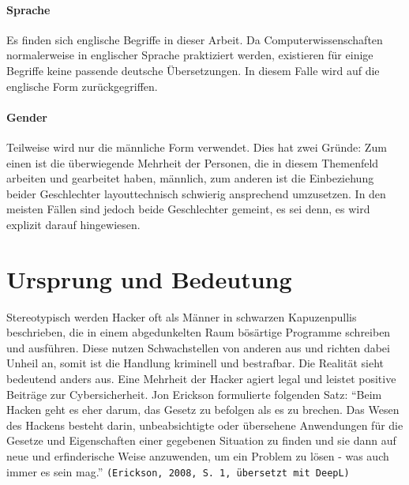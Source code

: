 \documentclass[11pt, a4paper]{article}
\begin{document}
\paragraph{Sprache}
Es finden sich englische Begriffe in dieser Arbeit. Da Computerwissenschaften normalerweise in englischer Sprache praktiziert werden, existieren für einige Begriffe keine passende deutsche Übersetzungen. In diesem Falle wird auf die englische Form zurückgegriffen.
\paragraph{Gender}
Teilweise wird nur die männliche Form verwendet. Dies hat zwei Gründe: Zum einen ist die überwiegende Mehrheit der Personen, die in diesem Themenfeld arbeiten und gearbeitet haben, männlich, zum anderen ist die Einbeziehung beider Geschlechter layouttechnisch schwierig ansprechend umzusetzen. In den meisten Fällen sind jedoch beide Geschlechter gemeint, es sei denn, es wird explizit darauf hingewiesen.

\newpage
\section{Ursprung und Bedeutung}
Stereotypisch werden Hacker oft als Männer in schwarzen Kapuzenpullis beschrieben, die in einem abgedunkelten Raum bösärtige Programme schreiben und ausführen. Diese nutzen Schwachstellen von anderen aus und richten dabei Unheil an, somit ist die Handlung kriminell und bestrafbar. Die Realität sieht bedeutend anders aus. Eine Mehrheit der Hacker agiert legal und leistet positive Beiträge zur Cybersicherheit. Jon Erickson formulierte folgenden Satz: ``Beim Hacken geht es eher darum, das Gesetz zu befolgen als es zu brechen. Das Wesen des Hackens besteht darin, unbeabsichtigte oder übersehene Anwendungen für die Gesetze und Eigenschaften einer gegebenen Situation zu finden und sie dann auf neue und erfinderische Weise anzuwenden, um ein Problem zu lösen - was auch immer es sein mag.'' \texttt{(Erickson, 2008, S. 1, übersetzt mit DeepL)} \cite{erickson2008hacking}
\end{document}
